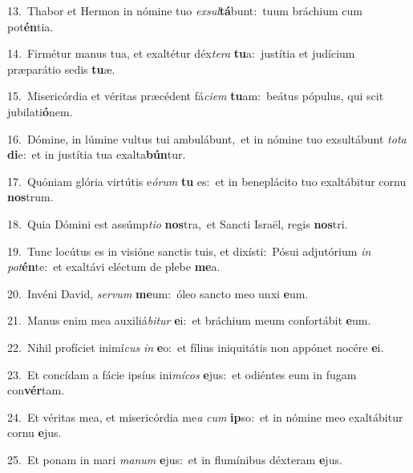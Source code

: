 {\numbfont\textcolor{\numbcolor}{13.}}~Thabor et Hermon in nómine tuo \textit{ex}\-\textit{sul}\textbf{tá}bunt:~\star tuum bráchium cum pot\-\textbf{én}\-tia.\par
{\numbfont\textcolor{\numbcolor}{14.}}~Firmétur manus tua, et exaltétur déx\-\textit{te}\-\textit{ra} \textbf{tu}\-a:~\star justítia et judícium præparátio sedis \textbf{tu}\-æ.\par
{\numbfont\textcolor{\numbcolor}{15.}}~Misericórdia et véritas præcédent fá\-\textit{ci}\-\textit{em} \textbf{tu}\-am:~\star beátus pópulus, qui scit jubilati\-\textbf{ó}\-nem.\par
{\numbfont\textcolor{\numbcolor}{16.}}~Dómine, in lúmine vultus tui ambulábunt,~\dagger et in nómine tuo exsultábunt \textit{to}\-\textit{ta} \textbf{di}\-e:~\star et in justítia tua exalta\-\textbf{bún}\-tur.\par
{\numbfont\textcolor{\numbcolor}{17.}}~Quóniam glória virtútis e\-\textit{ó}\-\textit{rum} \textbf{tu} es:~\star et in beneplácito tuo exaltábitur cornu \textbf{nos}\-trum.\par
{\numbfont\textcolor{\numbcolor}{18.}}~Quia Dómini est assúmp\-\textit{ti}\-\textit{o} \textbf{nos}\-tra,~\star et Sancti Israël, regis \textbf{nos}\-tri.\par
{\numbfont\textcolor{\numbcolor}{19.}}~Tunc locútus es in visióne sanctis tuis, et dixísti:~\dagger Pósui adjutórium \textit{in} \textit{pot}\-\textbf{én}te:~\star et exaltávi eléctum de plebe \textbf{me}\-a.\par
{\numbfont\textcolor{\numbcolor}{20.}}~Invéni David, \textit{ser}\-\textit{vum} \textbf{me}\-um:~\star óleo sancto meo unxi \textbf{e}\-um.\par
{\numbfont\textcolor{\numbcolor}{21.}}~Manus enim mea auxiliá\-\textit{bi}\-\textit{tur} \textbf{e}\-i:~\star et bráchium meum confortábit \textbf{e}\-um.\par
{\numbfont\textcolor{\numbcolor}{22.}}~Nihil profíciet inimí\textit{cus} \textit{in} \textbf{e}\-o:~\star et fílius iniquitátis non appónet nocére \textbf{e}\-i.\par
{\numbfont\textcolor{\numbcolor}{23.}}~Et concídam a fácie ipsíus ini\-\textit{mí}\-\textit{cos} \textbf{e}\-jus:~\star et odiéntes eum in fugam con\-\textbf{vér}\-tam.\par
{\numbfont\textcolor{\numbcolor}{24.}}~Et véritas mea, et misericórdia me\textit{a} \textit{cum} \textbf{ip}\-so:~\star et in nómine meo exaltábitur cornu \textbf{e}\-jus.\par
{\numbfont\textcolor{\numbcolor}{25.}}~Et ponam in mari \textit{ma}\-\textit{num} \textbf{e}\-jus:~\star et in flumínibus déxteram \textbf{e}\-jus.\par
